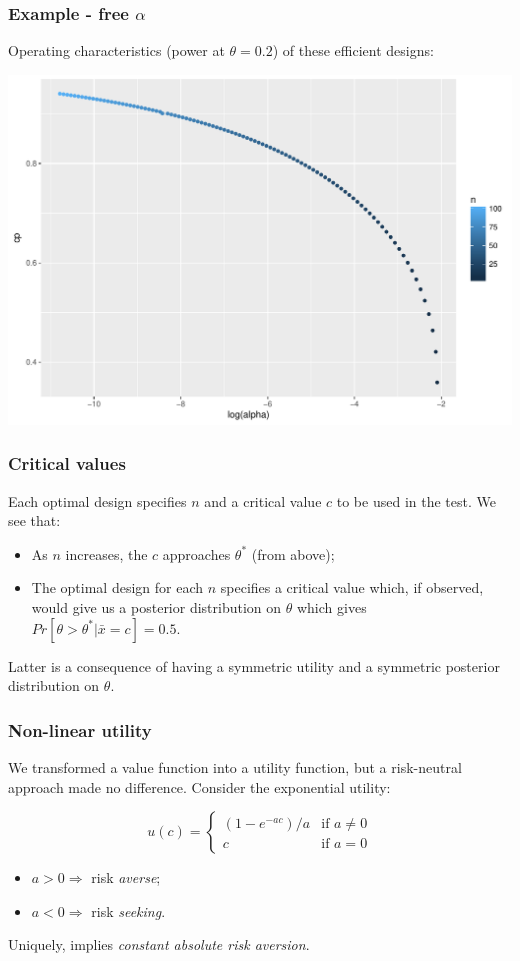 \documentclass{beamer}
\begin{document}
\begin{frame}
\frametitle{Example - free $\alpha$}
Operating characteristics (power at $\theta = 0.2$) of these efficient designs:

\centering
\includegraphics[scale=0.4]{OCs_log}
\end{frame}


\begin{frame}
\frametitle{Critical values}
Each optimal design specifies $n$ and a critical value $c$ to be used in the test. We see that:

\begin{itemize}
\item As $n$ increases, the $c$ approaches $\theta^{*}$ (from above);
\item The optimal design for each $n$ specifies a critical value which, if observed, would give us a posterior distribution on $\theta$ which gives $Pr[\theta > \theta^{*} | \bar{x} = c] = 0.5$.
\end{itemize}

Latter is a consequence of having a symmetric utility and a symmetric posterior distribution on $\theta$.
\end{frame}


\begin{frame}
\frametitle{Non-linear utility}
We transformed a value function into a utility function, but a risk-neutral approach made no difference. Consider the exponential utility:

\begin{equation}
  u(c) =
    \begin{cases}
      (1 - e^{-ac})/a & \text{if } a \neq 0\\
      c & \text{if } a = 0
    \end{cases}       
\end{equation}

\begin{itemize}
\item $ a > 0 \Rightarrow $ risk \emph{averse};
\item $ a < 0 \Rightarrow $ risk \emph{seeking}.
\end{itemize}

Uniquely, implies \emph{constant absolute risk aversion}.
\end{frame}
\end{document}
